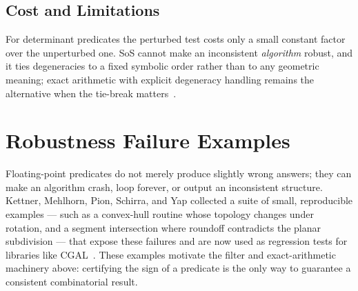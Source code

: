 \subsection{Cost and Limitations}
For determinant predicates the perturbed test costs only a small constant
factor over the unperturbed one. SoS cannot make an inconsistent
\emph{algorithm} robust, and it ties degeneracies to a fixed symbolic order
rather than to any geometric meaning; exact arithmetic with explicit
degeneracy handling remains the alternative when the tie-break matters~\cite{edelsbrunner1990,halperin2004}.

\section{Robustness Failure Examples}
\label{sec:robustness_failures}

Floating-point predicates do not merely produce slightly wrong answers; they
can make an algorithm crash, loop forever, or output an inconsistent
structure. Kettner, Mehlhorn, Pion, Schirra, and Yap collected a suite of
small, reproducible examples --- such as a convex-hull routine whose
topology changes under rotation, and a segment intersection where roundoff
contradicts the planar subdivision --- that expose these failures and are
now used as regression tests for libraries like CGAL~\cite{kettner2008}.
These examples motivate the filter and exact-arithmetic machinery above:
certifying the sign of a predicate is the only way to guarantee a consistent
combinatorial result.

